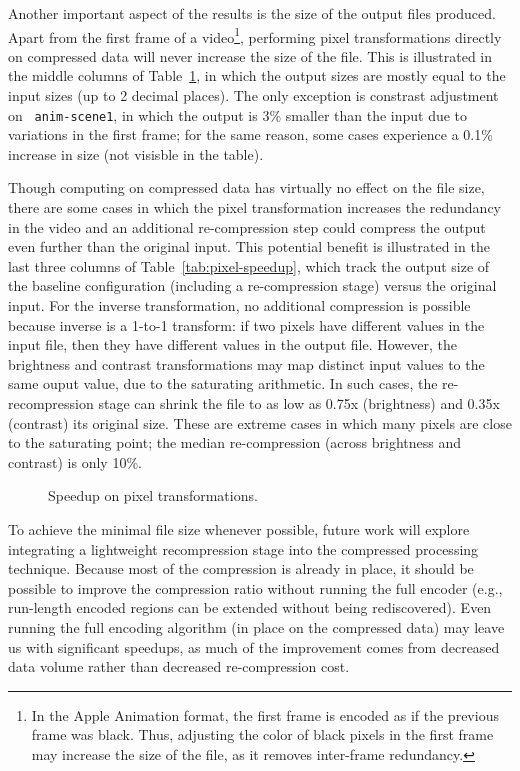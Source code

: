 Another important aspect of the results is the size of the output
files produced.  Apart from the first frame of a video\footnote{In the
Apple Animation format, the first frame is encoded as if the previous
frame was black.  Thus, adjusting the color of black pixels in the
first frame may increase the size of the file, as it removes
inter-frame redundancy.}, performing pixel transformations directly on
compressed data will never increase the size of the file.  This is
illustrated in the middle columns of Table~\ref{fig:pixel-speedup}, in
which the output sizes are mostly equal to the input sizes (up to 2
decimal places).  The only exception is constrast adjustment on {\tt
anim-scene1}, in which the output is 3\% smaller than the input due to
variations in the first frame; for the same reason, some cases
experience a 0.1\% increase in size (not visisble in the table).

Though computing on compressed data has virtually no effect on the
file size, there are some cases in which the pixel transformation
increases the redundancy in the video and an additional re-compression
step could compress the output even further than the original input.
This potential benefit is illustrated in the last three columns of
Table~\ref{tab:pixel-speedup}, which track the output size of the
baseline configuration (including a re-compression stage) versus the
original input.  For the inverse transformation, no additional
compression is possible because inverse is a 1-to-1 transform: if two
pixels have different values in the input file, then they have
different values in the output file.  However, the brightness and
contrast transformations may map distinct input values to the same
ouput value, due to the saturating arithmetic.  In such cases, the
re-recompression stage can shrink the file to as low as 0.75x
(brightness) and 0.35x (contrast) its original size.  These are
extreme cases in which many pixels are close to the saturating point;
the median re-compression (across brightness and contrast) is only
10\%.

\begin{figure}[t]
\caption{Speedup on pixel transformations.
\protect\label{fig:pixel-speedup}}
\end{figure}

To achieve the minimal file size whenever possible, future work will
explore integrating a lightweight recompression stage into the
compressed processing technique.  Because most of the compression is
already in place, it should be possible to improve the compression
ratio without running the full encoder (e.g., run-length encoded
regions can be extended without being rediscovered).  Even running the
full encoding algorithm (in place on the compressed data) may leave us
with significant speedups, as much of the improvement comes from
decreased data volume rather than decreased re-compression cost.

